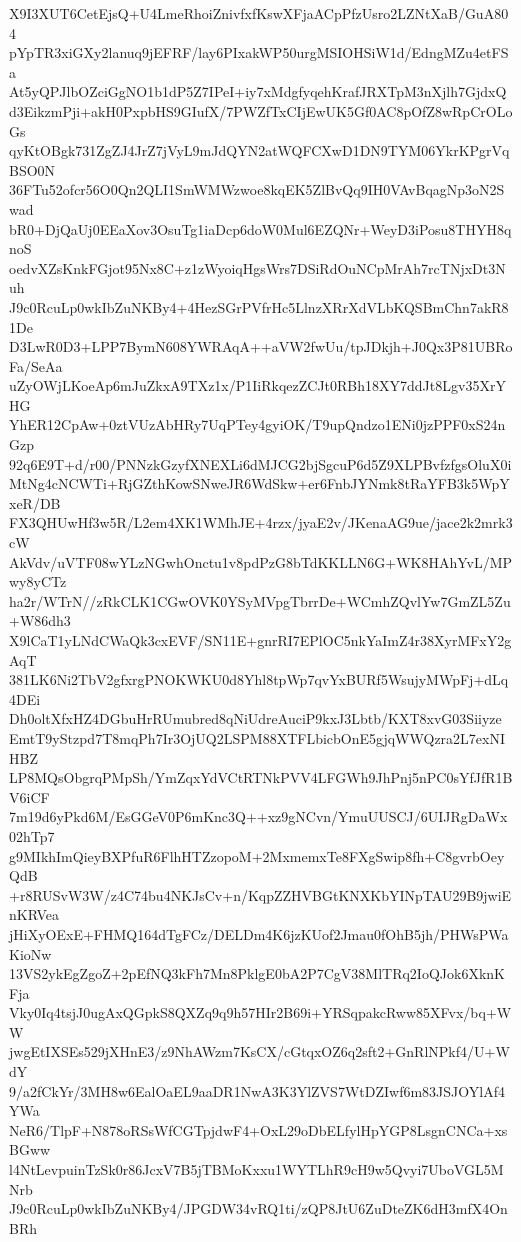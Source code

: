 X9I3XUT6CetEjsQ+U4LmeRhoiZnivfxfKswXFjaACpPfzUsro2LZNtXaB/GuA804
pYpTR3xiGXy2lanuq9jEFRF/lay6PIxakWP50urgMSIOHSiW1d/EdngMZu4etFSa
At5yQPJlbOZciGgNO1b1dP5Z7IPeI+iy7xMdgfyqehKrafJRXTpM3nXjlh7GjdxQ
d3EikzmPji+akH0PxpbHS9GIufX/7PWZfTxCIjEwUK5Gf0AC8pOfZ8wRpCrOLoGs
qyKtOBgk731ZgZJ4JrZ7jVyL9mJdQYN2atWQFCXwD1DN9TYM06YkrKPgrVqBSO0N
36FTu52ofcr56O0Qn2QLI1SmWMWzwoe8kqEK5ZlBvQq9IH0VAvBqagNp3oN2Swad
bR0+DjQaUj0EEaXov3OsuTg1iaDcp6doW0Mul6EZQNr+WeyD3iPosu8THYH8qnoS
oedvXZsKnkFGjot95Nx8C+z1zWyoiqHgsWrs7DSiRdOuNCpMrAh7rcTNjxDt3Nuh
J9c0RcuLp0wkIbZuNKBy4+4HezSGrPVfrHc5LlnzXRrXdVLbKQSBmChn7akR81De
D3LwR0D3+LPP7BymN608YWRAqA++aVW2fwUu/tpJDkjh+J0Qx3P81UBRoFa/SeAa
uZyOWjLKoeAp6mJuZkxA9TXz1x/P1IiRkqezZCJt0RBh18XY7ddJt8Lgv35XrYHG
YhER12CpAw+0ztVUzAbHRy7UqPTey4gyiOK/T9upQndzo1ENi0jzPPF0xS24nGzp
92q6E9T+d/r00/PNNzkGzyfXNEXLi6dMJCG2bjSgcuP6d5Z9XLPBvfzfgsOluX0i
MtNg4cNCWTi+RjGZthKowSNweJR6WdSkw+er6FnbJYNmk8tRaYFB3k5WpYxeR/DB
FX3QHUwHf3w5R/L2em4XK1WMhJE+4rzx/jyaE2v/JKenaAG9ue/jace2k2mrk3cW
AkVdv/uVTF08wYLzNGwhOnctu1v8pdPzG8bTdKKLLN6G+WK8HAhYvL/MPwy8yCTz
ha2r/WTrN//zRkCLK1CGwOVK0YSyMVpgTbrrDe+WCmhZQvlYw7GmZL5Zu+W86dh3
X9lCaT1yLNdCWaQk3cxEVF/SN11E+gnrRI7EPlOC5nkYaImZ4r38XyrMFxY2gAqT
381LK6Ni2TbV2gfxrgPNOKWKU0d8Yhl8tpWp7qvYxBURf5WsujyMWpFj+dLq4DEi
Dh0oltXfxHZ4DGbuHrRUmubred8qNiUdreAuciP9kxJ3Lbtb/KXT8xvG03Siiyze
EmtT9yStzpd7T8mqPh7Ir3OjUQ2LSPM88XTFLbicbOnE5gjqWWQzra2L7exNIHBZ
LP8MQsObgrqPMpSh/YmZqxYdVCtRTNkPVV4LFGWh9JhPnj5nPC0sYfJfR1BV6iCF
7m19d6yPkd6M/EsGGeV0P6mKnc3Q++xz9gNCvn/YmuUUSCJ/6UIJRgDaWx02hTp7
g9MIkhImQieyBXPfuR6FlhHTZzopoM+2MxmemxTe8FXgSwip8fh+C8gvrbOeyQdB
+r8RUSvW3W/z4C74bu4NKJsCv+n/KqpZZHVBGtKNXKbYINpTAU29B9jwiEnKRVea
jHiXyOExE+FHMQ164dTgFCz/DELDm4K6jzKUof2Jmau0fOhB5jh/PHWsPWaKioNw
13VS2ykEgZgoZ+2pEfNQ3kFh7Mn8PklgE0bA2P7CgV38MlTRq2IoQJok6XknKFja
Vky0Iq4tsjJ0ugAxQGpkS8QXZq9q9h57HIr2B69i+YRSqpakcRww85XFvx/bq+WW
jwgEtIXSEs529jXHnE3/z9NhAWzm7KsCX/cGtqxOZ6q2sft2+GnRlNPkf4/U+WdY
9/a2fCkYr/3MH8w6EalOaEL9aaDR1NwA3K3YlZVS7WtDZIwf6m83JSJOYlAf4YWa
NeR6/TlpF+N878oRSsWfCGTpjdwF4+OxL29oDbELfylHpYGP8LsgnCNCa+xsBGww
l4NtLevpuinTzSk0r86JcxV7B5jTBMoKxxu1WYTLhR9cH9w5Qvyi7UboVGL5MNrb
J9c0RcuLp0wkIbZuNKBy4/JPGDW34vRQ1ti/zQP8JtU6ZuDteZK6dH3mfX4OnBRh
